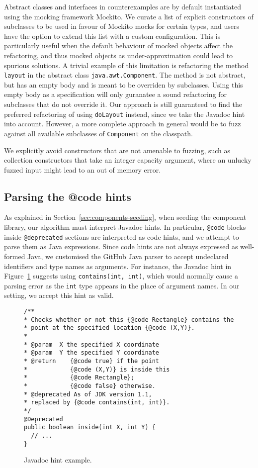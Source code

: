 \documentclass[sigconf,review,anonymous]{acmart}
\begin{document}
Abstract classes and interfaces in counterexamples are by default instantiated
using the mocking framework Mockito. We curate a list of explicit constructors
of subclasses to be used in favour of Mockito mocks for certain types, and users
have the option to extend this list with a custom configuration. This is
particularly useful when the default behaviour of mocked objects affect the
refactoring, and thus mocked objects as under-approximation could lead to
spurious solutions. A trivial example of this limitation is refactoring the
method \texttt{layout} in the abstract class \texttt{java.awt.Component}. The
method is not abstract, but has an empty body and is meant to be overriden by
subclasses. Using this empty body as a specification will only guranatee a sound
refactoring for subclasses that do not override it. Our approach is still
guaranteed to find the preferred refactoring of using \texttt{doLayout} instead,
since we take the Javadoc hint into account. However, a more complete approach
in general would be to fuzz against all available subclasses of
\texttt{Component} on the classpath.

We explicitly avoid constructors that are not amenable to fuzzing, such as
collection constructors that take an integer capacity argument, where an
unlucky fuzzed input might lead to an out of memory error.

\subsection{Parsing the @code hints}

As explained in Section~\ref{sec:components-seeding}, when seeding the component library, our algorithm must
interpret Javadoc hints. %
In particular, \texttt{@code} blocks inside \texttt{@deprecated} sections are interpreted as code
hints, and we attempt to parse them as Java expressions. Since code hints are
not always expressed as well-formed Java, we customised the
GitHub Java parser
to accept undeclared identifiers and type names
as arguments. For instance, the Javadoc hint in Figure~\ref{ex:javadoc-hint} suggests using
\texttt{contains(int, int)}, which would normally cause a parsing error as the \texttt{int} type
appears in the place of argument names. In our setting, we accept this hint as valid.


\begin{figure}
\begin{lstlisting}[mathescape=true,showstringspaces=false]
/**
* Checks whether or not this {@code Rectangle} contains the
* point at the specified location {@code (X,Y)}.
*
* @param  X the specified X coordinate
* @param  Y the specified Y coordinate
* @return    {@code true} if the point
*            {@code (X,Y)} is inside this
*            {@code Rectangle};
*            {@code false} otherwise.
* @deprecated As of JDK version 1.1,
* replaced by {@code contains(int, int)}.
*/
@Deprecated
public boolean inside(int X, int Y) {
  // ...
}
\end{lstlisting}
\caption{Javadoc hint example.}
\label{ex:javadoc-hint}
\end{figure}
\end{document}
